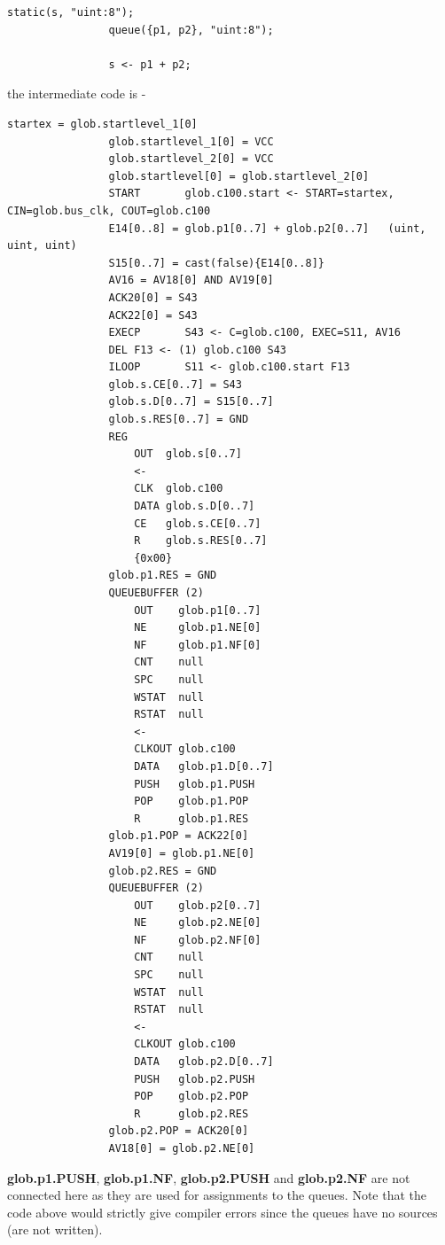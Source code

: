 \documentclass[10pt,a4paper,twoside,fleqn]{book}
\begin{document}
            \begin{lstlisting}[gobble=12, language=threepl]
                static(s, "uint:8");
                queue({p1, p2}, "uint:8");

                s <- p1 + p2;
            \end{lstlisting}
            the intermediate code is -
            \begin{lstlisting}[gobble=12, language=tde]
                startex = glob.startlevel_1[0]
                glob.startlevel_1[0] = VCC
                glob.startlevel_2[0] = VCC
                glob.startlevel[0] = glob.startlevel_2[0]
                START       glob.c100.start <- START=startex, CIN=glob.bus_clk, COUT=glob.c100
                E14[0..8] = glob.p1[0..7] + glob.p2[0..7]   (uint, uint, uint)
                S15[0..7] = cast(false){E14[0..8]}
                AV16 = AV18[0] AND AV19[0]
                ACK20[0] = S43
                ACK22[0] = S43
                EXECP       S43 <- C=glob.c100, EXEC=S11, AV16
                DEL F13 <- (1) glob.c100 S43
                ILOOP       S11 <- glob.c100.start F13
                glob.s.CE[0..7] = S43
                glob.s.D[0..7] = S15[0..7]
                glob.s.RES[0..7] = GND
                REG
                    OUT  glob.s[0..7]
                    <-
                    CLK  glob.c100
                    DATA glob.s.D[0..7]
                    CE   glob.s.CE[0..7]
                    R    glob.s.RES[0..7]
                    {0x00}
                glob.p1.RES = GND
                QUEUEBUFFER (2)
                    OUT    glob.p1[0..7]
                    NE     glob.p1.NE[0]
                    NF     glob.p1.NF[0]
                    CNT    null
                    SPC    null
                    WSTAT  null
                    RSTAT  null
                    <-
                    CLKOUT glob.c100
                    DATA   glob.p1.D[0..7]
                    PUSH   glob.p1.PUSH
                    POP    glob.p1.POP
                    R      glob.p1.RES
                glob.p1.POP = ACK22[0]
                AV19[0] = glob.p1.NE[0]
                glob.p2.RES = GND
                QUEUEBUFFER (2)
                    OUT    glob.p2[0..7]
                    NE     glob.p2.NE[0]
                    NF     glob.p2.NF[0]
                    CNT    null
                    SPC    null
                    WSTAT  null
                    RSTAT  null
                    <-
                    CLKOUT glob.c100
                    DATA   glob.p2.D[0..7]
                    PUSH   glob.p2.PUSH
                    POP    glob.p2.POP
                    R      glob.p2.RES
                glob.p2.POP = ACK20[0]
                AV18[0] = glob.p2.NE[0]
            \end{lstlisting}
            {\bf glob.p1.PUSH}, {\bf glob.p1.NF}, {\bf glob.p2.PUSH} and {\bf
            glob.p2.NF} are not connected here as they are used for assignments
            to the queues. Note that the code above would strictly give compiler
            errors since the queues have no sources (are not written). 
      
\end{document}
